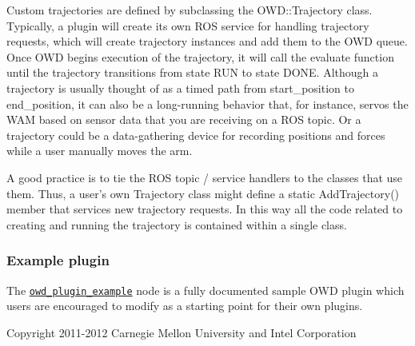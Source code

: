 Custom trajectories are defined by subclassing the O\-W\-D\-::\-Trajectory class. Typically, a plugin will create its own R\-O\-S service for handling trajectory requests, which will create trajectory instances and add them to the O\-W\-D queue. Once O\-W\-D begins execution of the trajectory, it will call the evaluate function until the trajectory transitions from state R\-U\-N to state D\-O\-N\-E. Although a trajectory is usually thought of as a timed path from start\-\_\-position to end\-\_\-position, it can also be a long-\/running behavior that, for instance, servos the W\-A\-M based on sensor data that you are receiving on a R\-O\-S topic. Or a trajectory could be a data-\/gathering device for recording positions and forces while a user manually moves the arm.

A good practice is to tie the R\-O\-S topic / service handlers to the classes that use them. Thus, a user's own Trajectory class might define a static Add\-Trajectory() member that services new trajectory requests. In this way all the code related to creating and running the trajectory is contained within a single class.\hypertarget{plugins_plugin_examples}{}\subsubsection{Example plugin}\label{plugins_plugin_examples}
The \href{http://personalrobotics.ri.cmu.edu/intel-pkg/owd_plugin_example/html/index.html}{\tt owd\-\_\-plugin\-\_\-example} node is a fully documented sample O\-W\-D plugin which users are encouraged to modify as a starting point for their own plugins.

\begin{DoxyVerb}Copyright 2011-2012 Carnegie Mellon University and Intel Corporation
\end{DoxyVerb}
 